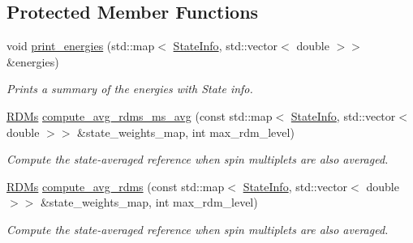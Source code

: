 \subsection*{Protected Member Functions}
\begin{DoxyCompactItemize}
\item 
void \mbox{\hyperlink{classforte_1_1_active_space_solver_aacff6aa65d24758c8ac71ec6ac8991f3}{print\+\_\+energies}} (std\+::map$<$ \mbox{\hyperlink{classforte_1_1_state_info}{State\+Info}}, std\+::vector$<$ double $>$$>$ \&energies)
\begin{DoxyCompactList}\small\item\em Prints a summary of the energies with State info. \end{DoxyCompactList}\item 
\mbox{\hyperlink{classforte_1_1_r_d_ms}{R\+D\+Ms}} \mbox{\hyperlink{classforte_1_1_active_space_solver_a851a96efeeb246b31117548fafbc2271}{compute\+\_\+avg\+\_\+rdms\+\_\+ms\+\_\+avg}} (const std\+::map$<$ \mbox{\hyperlink{classforte_1_1_state_info}{State\+Info}}, std\+::vector$<$ double $>$$>$ \&state\+\_\+weights\+\_\+map, int max\+\_\+rdm\+\_\+level)
\begin{DoxyCompactList}\small\item\em Compute the state-\/averaged reference when spin multiplets are also averaged. \end{DoxyCompactList}\item 
\mbox{\hyperlink{classforte_1_1_r_d_ms}{R\+D\+Ms}} \mbox{\hyperlink{classforte_1_1_active_space_solver_aeab569a38a2caee72f8f9967438f3e15}{compute\+\_\+avg\+\_\+rdms}} (const std\+::map$<$ \mbox{\hyperlink{classforte_1_1_state_info}{State\+Info}}, std\+::vector$<$ double $>$$>$ \&state\+\_\+weights\+\_\+map, int max\+\_\+rdm\+\_\+level)
\begin{DoxyCompactList}\small\item\em Compute the state-\/averaged reference when spin multiplets are also averaged. \end{DoxyCompactList}\end{DoxyCompactItemize}
